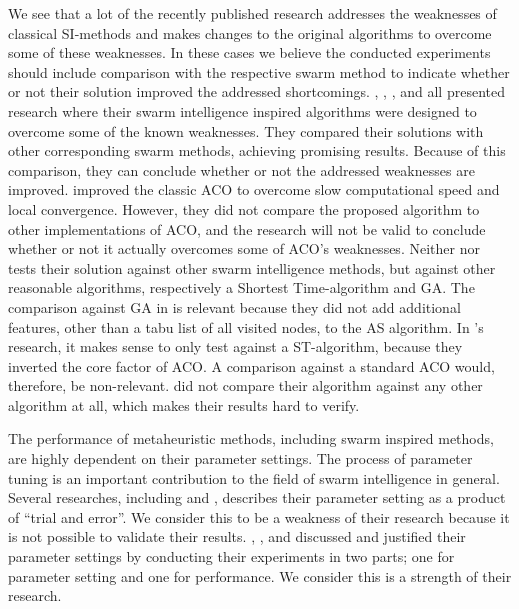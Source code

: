 We see that a lot of the recently published research addresses the weaknesses of classical SI-methods and makes changes to the original algorithms to overcome some of these weaknesses. In these cases we believe the conducted experiments should include comparison with the respective swarm method to indicate whether or not their solution improved the addressed shortcomings. \citet{tripathi09}, \citet{yang07}, \citet{salehinejad10}, and \citet{jiang10} all presented research where their swarm intelligence inspired algorithms were designed to overcome some of the known weaknesses. They compared their solutions with other corresponding swarm methods, achieving promising results. Because of this comparison, they can conclude whether or not the addressed weaknesses are improved. \citet{sedighpour14} improved the classic ACO to overcome slow computational speed and local convergence. However, they did not compare the proposed algorithm to other implementations of ACO, and the research will not be valid to conclude whether or not it actually overcomes some of ACO's weaknesses. 
Neither \citet{dias14} nor \citet{poorzahedy11} tests their solution against other swarm intelligence methods, but against other reasonable algorithms, respectively a Shortest Time-algorithm and GA. The comparison against GA in \citet{poorzahedy11} is relevant because they did not add additional features, other than a tabu list of all visited nodes, to the AS algorithm. In \citet{dias14}'s research, it makes sense to only test against a ST-algorithm, because they inverted the core factor of ACO. A comparison against a standard ACO would, therefore, be non-relevant. \citet{salehi-nezhad07} did not compare their algorithm against any other algorithm at all, which makes their results hard to verify. 

The performance of metaheuristic methods, including swarm inspired methods, are highly dependent on their parameter settings. The process of parameter tuning is an important contribution to the field of swarm intelligence in general. Several researches, including \citet{salehi-nezhad07} and \citet{yang07}, describes their parameter setting as a product of ``trial and error''. We consider this to be a weakness of their research because it is not possible to validate their results. \citet{sedighpour14}, \citet{poorzahedy11}, and \citet{kechagiopoulos14} discussed and justified their parameter settings by conducting their experiments in two parts; one for parameter setting and one for performance. We consider this is a strength of their research. 

